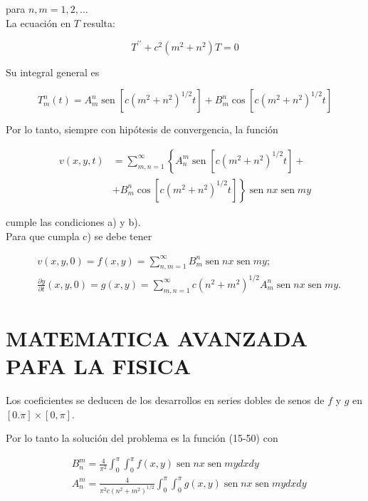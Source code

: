 \documentclass[10pt]{article}
\theoremstyle{plain}
\theoremstyle{definition}
\theoremstyle{remark}
\begin{document}
para $n, m=1,2, \ldots$\\
La ecuación en $T$ resulta:


\begin{equation*}
T^{\prime \prime}+c^{2}\left(m^{2}+n^{2}\right) T=0 \tag{15-49}
\end{equation*}


Su integral general es

$$
T_{m}^{n}(t)=A_{m}^{n} \operatorname{sen}\left[c\left(m^{2}+n^{2}\right)^{1 / 2} t\right]+B_{m}^{n} \cos \left[c\left(m^{2}+n^{2}\right)^{1 / 2} t\right]
$$

Por lo tanto, siempre con hipótesis de convergencia, la función


\begin{align*}
v(x, y, t) & =\sum_{m, n=1}^{\infty}\left\{A_{n}^{m} \operatorname{sen}\left[c\left(m^{2}+n^{2}\right)^{1 / 2} t\right]+\right. \\
& \left.+B_{m}^{n} \cos \left[c\left(m^{2}+n^{2}\right)^{1 / 2} t\right]\right\} \operatorname{sen} n x \operatorname{sen} m y \tag{15-50}
\end{align*}


cumple las condiciones a) y b).\\
Para que cumpla c) se debe tener

$$
\begin{aligned}
& v(x, y, 0)=f(x, y)=\sum_{n, m=1}^{\infty} B_{m}^{n} \operatorname{sen} n x \operatorname{sen} m y ; \\
& \frac{\partial y}{\partial t}(x, y, 0)=g(x, y)=\sum_{m, n=1}^{\infty} c\left(n^{2}+m^{2}\right)^{1 / 2} A_{m}^{n} \operatorname{sen} n x \operatorname{sen} m y .
\end{aligned}
$$

\section*{MATEMATICA AVANZADA PAFA LA FISICA}
Los coeficientes se deducen de los desarrollos en series dobles de senos de $f$ y $g$ en $[0 . \pi] \times[0, \pi]$.

Por lo tanto la solución del problema es la función (15-50) con

$$
\begin{aligned}
& B_{n}^{m}=\frac{4}{\pi^{2}} \int_{0}^{\pi} \int_{0}^{\pi} f(x, y) \operatorname{sen} n x \operatorname{sen} m y d x d y \\
& A_{n}^{m}=\frac{4}{\pi^{2} c\left(n^{2}+m^{2}\right)^{1 / 2}} \int_{0}^{\pi} \int_{0}^{\pi} g(x, y) \operatorname{sen} n x \operatorname{sen} m y d x d y
\end{aligned}
$$
\end{document}
